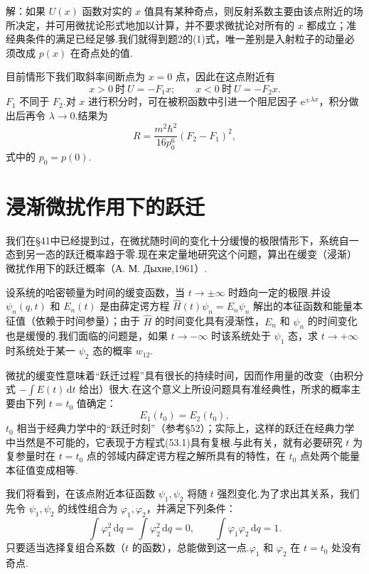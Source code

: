 \begin{xiti}
解：如果 $U(x)$ 函数对实的 $x$ 值具有某种奇点，则反射系数主要由该点附近的场所决定，并可用微扰论形式地加以计算，并不要求微扰论对所有的 $x$ 都成立；准经典条件的满足已经足够.我们就得到题2的(1)式，唯一差别是入射粒子的动量必须改成 $p(x)$ 在奇点处的值.

目前情形下我们取斜率间断点为 $x=0$ 点，因此在这点附近有
\begin{equation*}
  x>0\ \text{时}\ U=-F_1x;\qquad
  x<0\ \text{时}\ U=-F_2x.
\end{equation*}
$F_1$ 不同于 $F_2$.对 $x$ 进行积分时，可在被积函数中引进一个阻尼因子 $\mathrm{e}^{\pm\lambda x}$，积分做出后再令 $\lambda\to0$.结果为
\begin{equation*}
  R=\frac{m^2\hbar^2}{16p_0^6}(F_2-F_1)^2,
\end{equation*}
式中的 $p_0=p(0)$.

\end{xiti}
\renewcommand{\theequation}{\arabic{section}.\arabic{equation}}%

\section{浸渐微扰作用下的跃迁}

我们在§41中已经提到过，在微扰随时间的变化十分缓慢的极限情形下，系统自一态到另一态的跃迁概率趋于零.现在来定量地研究这个问题，算出在缓变（浸渐）微扰作用下的跃迁概率（А. М. Дыхне,1961）.

设系统的哈密顿量为时间的缓变函数，当 $t\to\pm\infty$ 时趋向一定的极限.并设 $\psi_n(q,t)$ 和 $E_n(t)$ 是由薛定谔方程 $\hat{H}(t)\psi_n=E_n\psi_n$ 解出的本征函数和能量本征值（依赖于时间参量）；由于 $\hat{H}$ 的时间变化具有浸渐性，$E_n$ 和 $\psi_n$ 的时间变化也是缓慢的.我们面临的问题是，如果 $t\to-\infty$ 时该系统处于 $\psi_1$ 态，求 $t\to+\infty$ 时系统处于某一 $\psi_2$ 态的概率 $w_{12}$.

微扰的缓变性意味着“跃迁过程”具有很长的持续时间，因而作用量的改变（由积分式 $-\int E(t)\,\mathrm{d}t$ 给出）很大.在这个意义上所设问题具有准经典性，所求的概率主要由下列 $t=t_0$ 值确定：
\begin{equation}
  E_1(t_0)=E_2(t_0),
\end{equation}
$t_0$ 相当于经典力学中的“跃迁时刻”（参考§52）；实际上，这样的跃迁在经典力学中当然是不可能的，它表现于方程式(53.1)具有复根.与此有关，就有必要研究 $t$ 为复参量时在 $t=t_0$ 点的邻域内薛定谔方程之解所具有的特性，在 $t_0$ 点处两个能量本征值变成相等.

我们将看到，在该点附近本征函数 $\psi_1,\psi_2$ 将随 $t$ 强烈变化.为了求出其关系，我们先令 $\psi_1,\psi_2$ 的线性组合为 $\varphi_1,\varphi_2$，并满足下列条件：
\begin{equation}
  \int\varphi_1^2\,\mathrm{d}q=\int\varphi_2^2\,\mathrm{d}q=0,\qquad
  \int\varphi_1\varphi_2\,\mathrm{d}q=1.
\end{equation}
只要适当选择复组合系数（$t$ 的函数），总能做到这一点.$\varphi_1$ 和 $\varphi_2$ 在 $t=t_0$ 处没有奇点.

